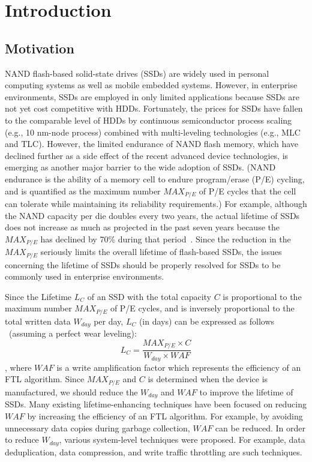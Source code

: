 
\chapter{Introduction} 
\label{chap:Introduction}

\section{Motivation}
\label{sec:Intro_Motivation}
NAND flash-based solid-state drives (SSDs) are widely used in personal computing
systems as well as mobile embedded systems. However, in enterprise environments,
SSDs are employed in only limited applications because SSDs are not yet cost 
competitive with HDDs. Fortunately, the prices for SSDs have fallen to the 
comparable level of HDDs by continuous semiconductor process scaling 
(e.g., 10 nm-node process) combined with multi-leveling technologies (e.g., 
MLC and TLC). However, the limited endurance of NAND flash memory, which have
declined further as a side effect of the recent advanced device technologies,
is emerging as another major barrier to the wide adoption of SSDs. (NAND endurance
is the ability of a memory cell to endure program/erase (P/E) cycling, and is
quantified as the maximum number $MAX_{P/E}$ of P/E cycles that the cell can tolerate
while maintaining its reliability requirements.) 
For example, although the NAND capacity per die doubles every two years, the 
actual lifetime of SSDs does not increase as much as projected in the past seven
years because the $MAX_{P/E}$ has declined by 70\% during that period~\cite{MooresLaw}.
Since the reduction in the $MAX_{P/E}$ seriously limits the overall lifetime of flash-based SSDs,
the issues concerning the lifetime of SSDs should be properly resolved for SSDs to be commonly 
used in enterprise environments.

Since the Lifetime $L_C$ of an SSD with the total capacity $C$ is proportional to 
the maximum number $MAX_{P/E}$ of P/E cycles, and is inversely proportional to the
total written data $W_{day}$ per day, $L_C$ (in days) can be expressed as follows
~\cite{DPES}(assuming a perfect wear leveling):
\[L_C = \frac{MAX_{P/E} \times C}{W_{day} \times WAF}\],
where $WAF$ is a write amplification factor which represents the efficiency of an FTL
algorithm. Since $MAX_{P/E}$ and $C$ is determined when the device is manufactured,
we should reduce the $W_{day}$ and $WAF$ to improve the lifetime of SSDs.
Many existing lifetime-enhancing techniques have been focused on reducing $WAF$
by increasing the efficiency of an FTL algorithm. For example, by avoiding
unnecessary data copies during garbage collection, $WAF$ can be reduced.
In order to reduce $W_{day}$, various system-level techniques were proposed.
For example, data deduplication, data compression, and write traffic 
throttling are such techniques.



